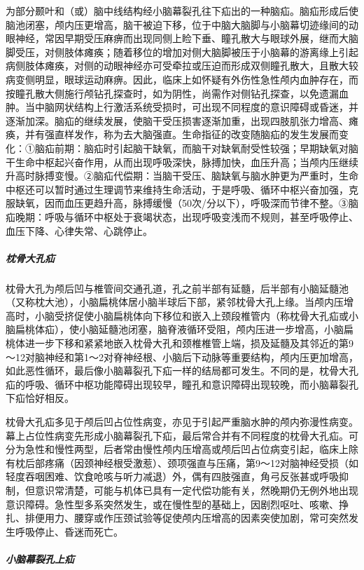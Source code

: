 为部分颞叶和（或）脑中线结构经小脑幕裂孔往下疝出的一种脑疝。脑疝形成后使脑池闭塞，颅内压更增高，脑干被迫下移，位于中脑大脑脚与小脑幕切迹缘间的动眼神经，常因早期受压麻痹而出现同侧上睑下垂、瞳孔散大与眼球外展，继而大脑脚受压，对侧肢体瘫痪；随着移位的增加对侧大脑脚被压于小脑幕的游离缘上引起病侧肢体瘫痪，对侧的动眼神经亦可受牵拉或压迫而形成双侧瞳孔散大，且散大较病变侧明显，眼球运动麻痹。因此，临床上如怀疑有外伤性急性颅内血肿存在，而按瞳孔散大侧施行颅钻孔探查时，如为阴性，尚需作对侧钻孔探查，以免遗漏血肿。当中脑网状结构上行激活系统受损时，可出现不同程度的意识障碍或昏迷，并逐渐加深。脑疝的继续发展，使脑干受压损害逐渐加重，出现四肢肌张力增高、瘫痪，并有强直样发作，称为去大脑强直。生命指征的改变随脑疝的发生发展而变化：①脑疝前期：脑疝时引起脑干缺氧，而脑干对缺氧耐受性较强；早期缺氧对脑干生命中枢起兴奋作用，从而出现呼吸深快，脉搏加快，血压升高；当颅内压继续升高时脉搏变慢。②脑疝代偿期：当脑干受压、脑缺氧与脑水肿更为严重时，生命中枢还可以暂时通过生理调节来维持生命活动，于是呼吸、循环中枢兴奋加强，克服缺氧，因而血压更趋升高，脉搏缓慢（50次/分以下），呼吸深而节律不整。③脑疝晚期：呼吸与循环中枢处于衰竭状态，出现呼吸变浅而不规则，甚至呼吸停止、血压下降、心律失常、心跳停止。

\subparagraph{枕骨大孔疝}

枕骨大孔为颅后凹与椎管间交通孔道，孔之前半部有延髓，后半部有小脑延髓池（又称枕大池），小脑扁桃体居小脑半球后下部，紧邻枕骨大孔上缘。当颅内压增高时，小脑受挤促使小脑扁桃体向下移位和嵌入上颈段椎管内（称枕骨大孔疝或小脑扁桃体疝），使小脑延髓池闭塞，脑脊液循环受阻，颅内压进一步增高，小脑扁桃体进一步下移和紧紧地嵌入枕骨大孔和颈椎椎管上端，损及延髓及其邻近的第9～12对脑神经和第1～2对脊神经根、小脑后下动脉等重要结构，颅内压更加增高，如此恶性循环，最后像小脑幕裂孔下疝一样的结局都可发生。不同的是，枕骨大孔疝的呼吸、循环中枢功能障碍出现较早，瞳孔和意识障碍出现较晚，而小脑幕裂孔下疝恰好相反。

枕骨大孔疝多见于颅后凹占位性病变，亦见于引起严重脑水肿的颅内弥漫性病变。幕上占位性病变先形成小脑幕裂孔下疝，最后常合并有不同程度的枕骨大孔疝。可分为急性和慢性两型，后者常由慢性颅内压增高或颅后凹占位病变引起，临床上除有枕后部疼痛（因颈神经根受激惹）、颈项强直与压痛，第9～12对脑神经受损（如轻度吞咽困难、饮食呛咳与听力减退）外，偶有四肢强直，角弓反张甚或呼吸抑制，但意识常清楚，可能与机体已具有一定代偿功能有关，然晚期仍无例外地出现意识障碍。急性型多系突然发生，或在慢性型的基础上，因剧烈呕吐、咳嗽、挣扎、排便用力、腰穿或作压颈试验等促使颅内压增高的因素突使加剧，常可突然发生呼吸停止、昏迷而死亡。

\subparagraph{小脑幕裂孔上疝}

